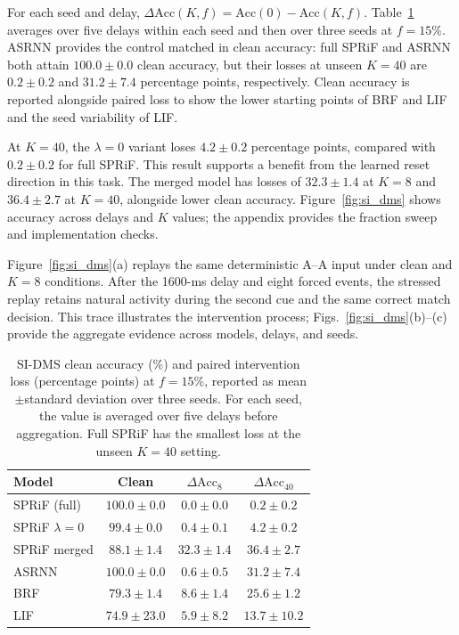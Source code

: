 \documentclass[letterpaper]{article} %
\begin{document}
For each seed and delay, $\Delta\mathrm{Acc}(K,f)=\mathrm{Acc}(0)-\mathrm{Acc}(K,f)$. Table~\ref{tab:si_dms} averages over five delays within each seed and then over three seeds at $f=15\%$. ASRNN provides the control matched in clean accuracy: full SPRiF and ASRNN both attain $100.0{\pm}0.0$ clean accuracy, but their losses at unseen $K=40$ are $0.2{\pm}0.2$ and $31.2{\pm}7.4$ percentage points, respectively. Clean accuracy is reported alongside paired loss to show the lower starting points of BRF and LIF and the seed variability of LIF.

At $K=40$, the $\lambda{=}0$ variant loses $4.2{\pm}0.2$ percentage points, compared with $0.2{\pm}0.2$ for full SPRiF. This result supports a benefit from the learned reset direction in this task. The merged model has losses of $32.3{\pm}1.4$ at $K=8$ and $36.4{\pm}2.7$ at $K=40$, alongside lower clean accuracy. Figure~\ref{fig:si_dms} shows accuracy across delays and $K$ values; the appendix provides the fraction sweep and implementation checks.

Figure~\ref{fig:si_dms}(a) replays the same deterministic A--A input under clean and $K=8$ conditions. After the 1600-ms delay and eight forced events, the stressed replay retains natural activity during the second cue and the same correct match decision. This trace illustrates the intervention process; Figs.~\ref{fig:si_dms}(b)--(c) provide the aggregate evidence across models, delays, and seeds.

\begin{table}[t]
\centering
\begin{tabular}{lccc}
\toprule
Model & Clean & $\Delta\mathrm{Acc}_{8}$ & $\Delta\mathrm{Acc}_{40}$ \\
\midrule
SPRiF (full) & $100.0{\pm}0.0$ & $\mathbf{0.0{\pm}0.0}$ & $\mathbf{0.2{\pm}0.2}$ \\
SPRiF $\lambda{=}0$ & $99.4{\pm}0.0$ & $0.4{\pm}0.1$ & $4.2{\pm}0.2$ \\
SPRiF merged & $88.1{\pm}1.4$ & $32.3{\pm}1.4$ & $36.4{\pm}2.7$ \\
\midrule
ASRNN & $100.0{\pm}0.0$ & $0.6{\pm}0.5$ & $31.2{\pm}7.4$ \\
BRF & $79.3{\pm}1.4$ & $8.6{\pm}1.4$ & $25.6{\pm}1.2$ \\
LIF & $74.9{\pm}23.0$ & $5.9{\pm}8.2$ & $13.7{\pm}10.2$ \\
\bottomrule
\end{tabular}
\caption{SI-DMS clean accuracy (\%) and paired intervention loss (percentage points) at $f=15\%$, reported as mean$\pm$standard deviation over three seeds. For each seed, the value is averaged over five delays before aggregation. Full SPRiF has the smallest loss at the unseen $K=40$ setting.}
\label{tab:si_dms}
\end{table}
\end{document}
